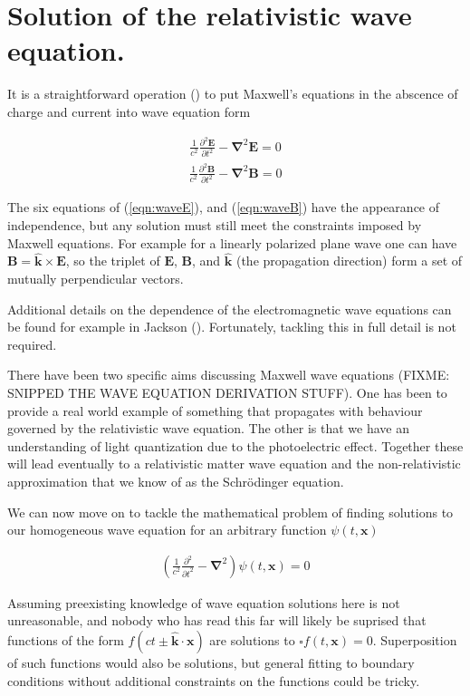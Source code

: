 \documentclass[]{eliblog}
\newcommand{\BB}[0]{\mathbf{B}}
\newcommand{\BE}[0]{\mathbf{E}}
\newcommand{\Bk}[0]{\mathbf{k}}
\newcommand{\Bx}[0]{\mathbf{x}}
\newcommand{\cross}[0]{\times}
\newcommand{\spacegrad}[0]{\boldsymbol{\nabla}}
\newcommand{\delambertian}[0]{\square}
\newcommand{\inv}[1]{\frac{1}{#1}}
\newcommand{\kcap}[0]{\hat{\Bk}}
\begin{document}
\section{Solution of the relativistic wave equation.}

It is a straightforward operation (\cite{fleisch2007ssg}) to put Maxwell's
equations in the abscence of charge and current into wave equation form

\begin{align}\label{eqn:waveE}
\inv{c^2} \frac{\partial^2 \BE}{\partial t^2} - \spacegrad^2 \BE = 0
\end{align}
\begin{align}\label{eqn:waveB}
\inv{c^2} \frac{\partial^2 \BB}{\partial t^2} - \spacegrad^2 \BB = 0
\end{align}

The six equations of (\ref{eqn:waveE}), and (\ref{eqn:waveB}) have the
appearance of independence, but any solution must still meet the constraints imposed by Maxwell equations.  For example for a linearly polarized plane wave one can have $\BB = \kcap \cross \BE$, so the triplet of $\BE$, $\BB$, and $\kcap$ (the propagation direction) form a set of mutually perpendicular vectors.

Additional details on the dependence of the electromagnetic wave equations can be found for example in Jackson (\cite{jackson1975cewWave}).  Fortunately, tackling this in full detail is not required.  

There have been two specific aims discussing Maxwell wave equations (FIXME: SNIPPED THE WAVE EQUATION DERIVATION STUFF).
One has been to provide a real world example of something that propagates with behaviour governed by the relativistic wave equation.  The other is that we have an understanding of light quantization due to the photoelectric effect.  Together these will lead eventually to a relativistic matter wave equation and the non-relativistic approximation that we know of as the Schr\"{o}dinger equation.

We can now move on to tackle the mathematical problem of finding solutions to our 
homogeneous wave equation for an arbitrary function $\psi(t,\Bx)$

\begin{align}
\left( \frac{1}{c^2}\frac{\partial^2}{{\partial t}^2} - \spacegrad^2 \right) \psi(t,\Bx) = 0
\end{align}

Assuming preexisting knowledge of wave equation solutions here is not unreasonable, and nobody who has read this far will likely be suprised that functions of the form $f(ct \pm \kcap \cdot \Bx)$ are solutions to $\delambertian f(t,\Bx) = 0$.  Superposition of such functions would also be solutions, but general fitting to boundary conditions without additional constraints on the functions could be tricky.
\end{document}

